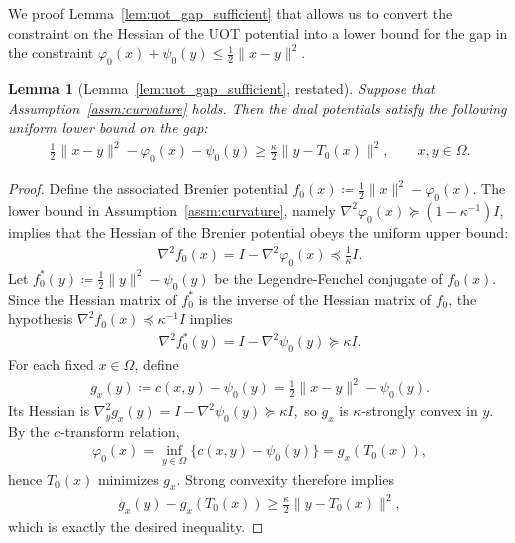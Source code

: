 \documentclass[11pt,reqno]{amsart}
\newtheorem{lemma}[theorem]{Lemma}
\theoremstyle{definition}
\begin{document}
We proof Lemma~\ref{lem:uot_gap_sufficient} that allows us to convert the constraint on the Hessian of the UOT potential into a lower bound for the gap in the constraint $\varphi_0(x)+\psi_0(y) \le \frac{1}{2}\|x-y\|^2$. 
\begin{lemma}[{Lemma~\ref{lem:uot_gap_sufficient}, restated}]
Suppose that Assumption~\ref{assm:curvature} holds. Then the dual potentials satisfy the following uniform lower bound on the gap:
\begin{align}
    \frac{1}{2}\|x-y\|^2-\varphi_0(x)-\psi_0(y)
    \ge \frac{\kappa}{2}\|y-T_0(x)\|^2,
    \qquad x,y\in\Omega.
\end{align}
\end{lemma}
\begin{proof}
Define the associated Brenier potential $f_0(x) \coloneqq \frac{1}{2}\|x\|^2 - \varphi_0(x)$. The lower bound in Assumption~\ref{assm:curvature}, namely $\nabla^2 \varphi_0(x) \succeq (1 - \kappa^{-1})I$, implies that the Hessian of the Brenier potential obeys the uniform upper bound:
\begin{align}
    \nabla^2 f_0(x) = I - \nabla^2 \varphi_0(x) \preceq \frac{1}{\kappa} I.
\end{align}
 Let $f_0^*(y) \coloneqq \tfrac{1}{2}\|y\|^2 - \psi_0(y)$ be the Legendre-Fenchel conjugate of $f_0(x)$. Since the Hessian matrix of $f^*_0$ is the inverse of the Hessian matrix of $f_0$, the hypothesis $\nabla^2 f_0(x) \preceq \kappa^{-1} I$ implies
\begin{align}
   \nabla^2 f_0^*(y)  = I - \nabla^2 \psi_0(y) \succeq \kappa I.
\end{align}
 For each fixed $x\in\Omega$, define
\begin{align}
    g_x(y) \coloneqq c(x,y)-\psi_0(y)
    = \tfrac{1}{2}\|x-y\|^2 - \psi_0(y).
\end{align}
Its Hessian is
$
    \nabla_y^2 g_x(y) = I - \nabla^2\psi_0(y) \succeq \kappa I,
$
so $g_x$ is $\kappa$-strongly convex in $y$.
By the $c$-transform relation,
\begin{align}
    \varphi_0(x) = \inf_{y\in\Omega} \bigl\{ c(x,y)-\psi_0(y) \bigr\}
    = g_x(T_0(x)),
\end{align}
hence $T_0(x)$ minimizes $g_x$.
Strong convexity therefore implies
\begin{align}
    g_x(y)-g_x(T_0(x))
    \ge \frac{\kappa}{2}\|y-T_0(x)\|^2,
\end{align}
which is exactly the desired inequality.  
\end{proof}
\end{document}
